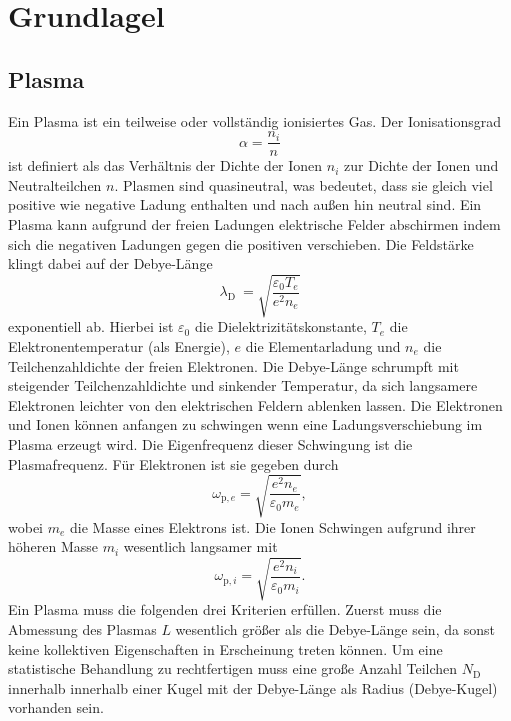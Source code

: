 \section{Grundlagel}
\subsection{Plasma}
Ein Plasma ist ein teilweise oder vollst\"andig ionisiertes Gas.
Der Ionisationsgrad
\begin{equation}
\alpha
    =\frac{n_i}{n}
    \label{eq:a}
\end{equation}
ist definiert als das Verh\"altnis der Dichte der Ionen $n_i$ zur Dichte der Ionen und Neutralteilchen $n$.
Plasmen sind quasineutral, was bedeutet, dass sie gleich viel positive wie negative Ladung enthalten und nach au\ss en hin neutral sind.
Ein Plasma kann aufgrund der freien Ladungen elektrische Felder abschirmen indem sich die negativen Ladungen gegen die positiven verschieben.
Die Feldst\"arke klingt dabei auf der Debye-L\"ange
\begin{equation}
\lambda_\text{D}\
    =\sqrt{\frac{\varepsilon_0 T_e}{e^2n_e}}
    \label{eq:lD}
\end{equation}
exponentiell ab.
Hierbei ist $\varepsilon_0$ die Dielektrizit\"atskonstante, $T_e$ die Elektronentemperatur (als Energie), $e$ die Elementarladung und $n_e$ die Teilchenzahldichte der freien Elektronen.
Die Debye-L\"ange schrumpft mit steigender Teilchenzahldichte und sinkender Temperatur, da sich langsamere Elektronen leichter von den elektrischen Feldern ablenken lassen.
Die Elektronen und Ionen k\"onnen anfangen zu schwingen wenn eine Ladungsverschiebung im Plasma erzeugt wird.
Die Eigenfrequenz dieser Schwingung ist die Plasmafrequenz.
F\"ur Elektronen ist sie gegeben durch
\begin{equation}
\omega_{\text{p},e}
    =\sqrt{\frac{e^2n_e}{\varepsilon_0m_e}},
    \label{eq:wpe}
\end{equation}
wobei $m_e$ die Masse eines Elektrons ist.
Die Ionen Schwingen aufgrund ihrer h\"oheren Masse $m_i$ wesentlich langsamer mit
\begin{equation}
\omega_{\text{p},i}
    =\sqrt{\frac{e^2n_i}{\varepsilon_0m_i}}.
    \label{eq:wpi}
\end{equation}
Ein Plasma muss die folgenden drei Kriterien erf\"ullen.
Zuerst muss die Abmessung des Plasmas $L$ wesentlich gr\"o\ss er als die Debye-L\"ange sein, da sonst keine kollektiven Eigenschaften in Erscheinung treten k\"onnen.
Um eine statistische Behandlung zu rechtfertigen muss eine gro\ss e Anzahl Teilchen $N_\text{D}$ innerhalb innerhalb einer Kugel mit der Debye-L\"ange als Radius (Debye-Kugel) vorhanden sein.
